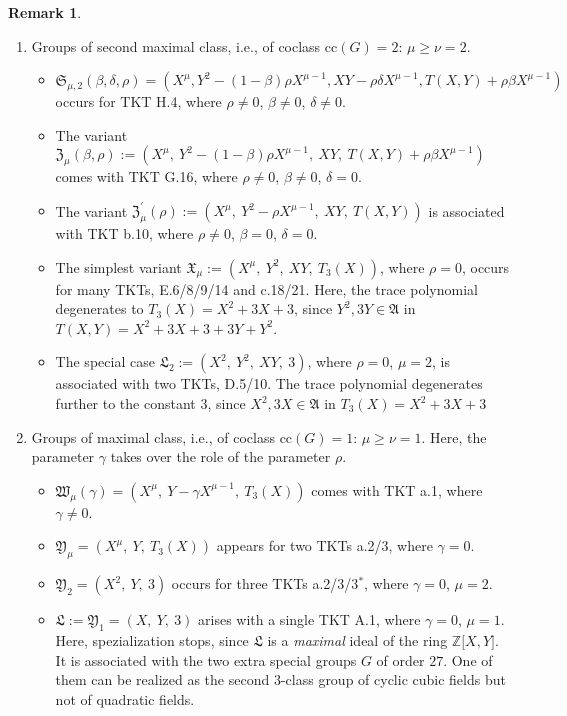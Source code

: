 \documentclass{amsart}
\theoremstyle{definition}
\newtheorem{remark}{Remark}[section]
\numberwithin{equation}{section}
\begin{document}
\begin{remark}
\begin{enumerate}
\item
Groups of second maximal class, i.e., of coclass \(\mathrm{cc}(G)=2\):
\(\mu\ge\nu=2\).

\begin{itemize}
\item
\(\mathfrak{S}_{\mu,2}(\beta,\delta,\rho)
=\left(X^{\mu},Y^{2}-(1-\beta)\rho X^{\mu-1},XY-\rho\delta X^{\mu-1},T(X,Y)+\rho\beta X^{\mu-1}\right)\)
occurs for TKT H.4, where \(\rho\ne 0\), \(\beta\ne 0\), \(\delta\ne 0\).
\item
The variant
\(\mathfrak{Z}_{\mu}(\beta,\rho)
:=\left(X^{\mu},\ Y^{2}-(1-\beta)\rho X^{\mu-1},\ XY,\ T(X,Y)+\rho\beta X^{\mu-1}\right)\)
comes with TKT G.16, where \(\rho\ne 0\), \(\beta\ne 0\), \(\delta=0\).
\item
The variant
\(\mathfrak{Z}^\prime_{\mu}(\rho)
:=\left(X^{\mu},\ Y^{2}-\rho X^{\mu-1},\ XY,\ T(X,Y)\right)\)
is associated with TKT b.10, where \(\rho\ne 0\), \(\beta=0\), \(\delta=0\).
\item
The simplest variant
\(\mathfrak{X}_{\mu}
:=\left(X^{\mu},\ Y^{2},\ XY,\ T_3(X)\right)\), where \(\rho=0\),
occurs for many TKTs, E.6/8/9/14 and c.18/21.
Here, the trace polynomial degenerates to \(T_3(X)=X^2+3X+3\),
since \(Y^2,3Y\in\mathfrak{A}\) in \(T(X,Y)=X^2+3X+3+3Y+Y^2\).
\item
The special case
\(\mathfrak{L}_{2}
:=\left(X^{2},\ Y^{2},\ XY,\ 3\right)\), where \(\rho=0\), \(\mu=2\),
is associated with two TKTs, D.5/10.
The trace polynomial degenerates further to the constant \(3\),
since \(X^2,3X\in\mathfrak{A}\) in \(T_3(X)=X^2+3X+3\)
\end{itemize}

\item
Groups of maximal class, i.e., of coclass \(\mathrm{cc}(G)=1\):
\(\mu\ge\nu=1\).
Here, the parameter \(\gamma\) takes over the role of the parameter \(\rho\).

\begin{itemize}
\item 
\(\mathfrak{W}_{\mu}(\gamma)=\left(X^{\mu},\ Y-\gamma X^{\mu-1},\ T_3(X)\right)\)
comes with TKT a.1, where \(\gamma\ne 0\).
\item
\(\mathfrak{Y}_{\mu}=\left(X^{\mu},\ Y,\ T_3(X)\right)\)
appears for two TKTs a.2/3, where \(\gamma=0\).
\item
\(\mathfrak{Y}_{2}=\left(X^{2},\ Y,\ 3\right)\)
occurs for three TKTs a.2/3/3\({}^\ast\), where \(\gamma=0\), \(\mu=2\).
\item
\(\mathfrak{L}:=\mathfrak{Y}_{1}=\left(X,\ Y,\ 3\right)\)
arises with a single TKT A.1, where \(\gamma=0\), \(\mu=1\).
Here, spezialization stops,
since \(\mathfrak{L}\) is a \textit{maximal} ideal of the ring \(\mathbb{Z}\lbrack X,Y\rbrack\).
It is associated with the two extra special groups \(G\) of order \(27\).
One of them can be realized as the second \(3\)-class group of cyclic cubic fields
but not of quadratic fields.
\end{itemize}


\end{enumerate}
\end{remark}
\end{document}
